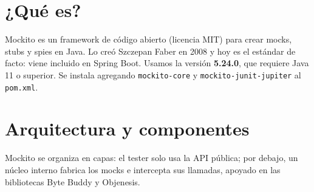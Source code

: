 \documentclass[11pt,a4paper,oneside]{report}
\newcommand{\code}[1]{\texttt{#1}}
\begin{document}
\section{¿Qué es?}
Mockito es un framework de código abierto (licencia MIT) para crear mocks, stubs y spies en Java. Lo creó Szczepan Faber en 2008 y hoy es el estándar de facto: viene incluido en Spring Boot. Usamos la versión \textbf{5.24.0}, que requiere Java 11 o superior. Se instala agregando \code{mockito-core} y \code{mockito-junit-jupiter} al \code{pom.xml}.

\section{Arquitectura y componentes}
Mockito se organiza en capas: el tester solo usa la API pública; por debajo, un núcleo interno fabrica los mocks e intercepta sus llamadas, apoyado en las bibliotecas Byte Buddy y Objenesis.
\end{document}
